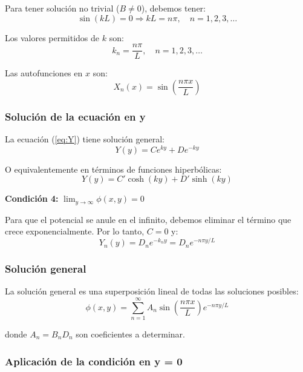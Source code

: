 \documentclass[a4paper]{article}
\begin{document}
Para tener solución no trivial ($B \neq 0$), debemos tener:
\begin{equation}
\sin(kL) = 0 \Rightarrow kL = n\pi, \quad n = 1, 2, 3, \ldots
\end{equation}

Los valores permitidos de $k$ son:
\begin{equation}
k_n = \frac{n\pi}{L}, \quad n = 1, 2, 3, \ldots
\end{equation}

Las autofunciones en $x$ son:
\begin{equation}
X_n(x) = \sin\left(\frac{n\pi x}{L}\right)
\end{equation}

\subsubsection{Solución de la ecuación en y}

La ecuación (\ref{eq:Y}) tiene solución general:
\begin{equation}
Y(y) = C e^{ky} + D e^{-ky}
\end{equation}

O equivalentemente en términos de funciones hiperbólicas:
\begin{equation}
Y(y) = C' \cosh(ky) + D' \sinh(ky)
\end{equation}

\textbf{Condición 4:} $\lim_{y \to \infty} \phi(x, y) = 0$

Para que el potencial se anule en el infinito, debemos eliminar el término que crece exponencialmente. Por lo tanto, $C = 0$ y:
\begin{equation}
Y_n(y) = D_n e^{-k_n y} = D_n e^{-n\pi y/L}
\end{equation}

\subsubsection{Solución general}

La solución general es una superposición lineal de todas las soluciones posibles:
\begin{equation}
\phi(x, y) = \sum_{n=1}^{\infty} A_n \sin\left(\frac{n\pi x}{L}\right) e^{-n\pi y/L}
\end{equation}

donde $A_n = B_n D_n$ son coeficientes a determinar.

\subsubsection{Aplicación de la condición en y = 0}
\end{document}

